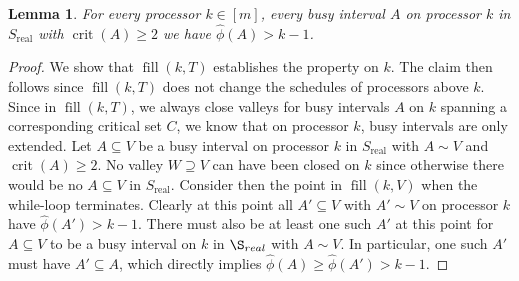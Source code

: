 \documentclass[a4paper]{article}
\DeclareMathOperator{\real}{real}
\DeclareMathOperator{\crit}{crit}
\DeclareMathOperator{\fillop}{fill}
\newtheorem{lemma}[theorem]{Lemma}
\begin{document}
\begin{lemma}\label{lemma:phi_prop}
  For every processor $k \in [m]$, every busy interval $A$ on processor $k$ in $S_{\real}$ with $\crit(A) \geq 2$ we have $\hat \phi(A) > k - 1$.
\end{lemma}
\begin{proof}
  We show that $\fillop(k, T)$ establishes the property on $k$.
  The claim then follows since $\fillop(k, T)$ does not change the schedules of processors above $k$.
  Since in $\fillop(k, T)$, we always close valleys for busy intervals $A$ on $k$ spanning a corresponding critical set $C$, we know that on processor $k$, busy intervals are only extended.
  Let $A \subseteq V$ be a busy interval on processor $k$ in $S_{\real}$ with $A \sim V$ and $\crit(A) \geq 2$.
  No valley $W \supseteq V$ can have been closed on $k$ since otherwise there would be no $A \subseteq V$ in $S_{\real}$.
  Consider then the point in $\fillop(k, V)$ when the while-loop terminates.
  Clearly at this point all $A' \subseteq V$ with $A' \sim V$ on processor $k$ have $\hat \phi(A') > k - 1$.
  There must also be at least one such $A'$ at this point for $A \subseteq V$ to be a busy interval on $k$ in $\S_{real}$ with $A \sim V$.
  In particular, one such $A'$ must have $A' \subseteq A$, which directly implies $\hat \phi(A) \geq \hat \phi(A') > k - 1$.
\end{proof}
\end{document}
